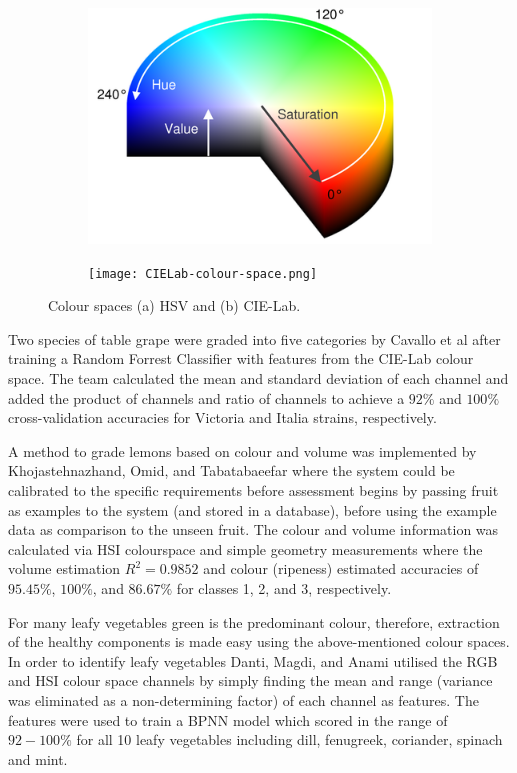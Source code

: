 \documentclass[fleqn,twoside,12pt]{report}
\begin{document}
\begin{figure}[h]
	\centering
	\begin{subfigure}{.5\textwidth}
		\centering
		\includegraphics[width=.7\linewidth]{hue_sat.png}
		\caption{}
		\label{fig:HSV}
	\end{subfigure}%
	\begin{subfigure}{.5\textwidth}
		\centering
		\texttt{[image: CIELab-colour-space.png]}
		\caption{}
		\label{fig:Lab}
	\end{subfigure}%
	\caption{Colour spaces (a) HSV and (b) CIE-Lab.}
	\label{fig:colour-space}
\end{figure}

Two species of table grape were graded into five categories by Cavallo et al \cite{cavallo} after training a Random Forrest Classifier with features from the CIE-Lab colour space. The team calculated the mean and standard deviation of each channel and added the product of channels and ratio of channels to achieve a $92\%$ and $100\%$ cross-validation accuracies for Victoria and Italia strains, respectively.

A method to grade lemons based on colour and volume was implemented by Khojastehnazhand, Omid, and Tabatabaeefar \cite{khojastehnazhand} where the system could be calibrated to the specific requirements before assessment begins by passing fruit as examples to the system (and stored in a database), before using the example data as comparison to the unseen fruit. The colour and volume information was calculated via HSI colourspace and simple geometry measurements where the volume estimation $R^2 = 0.9852$ and colour (ripeness) estimated accuracies of $95.45\%$, $100\%$, and $86.67\%$ for classes 1, 2, and 3, respectively.

For many leafy vegetables green is the predominant colour, therefore, extraction of the healthy components is made easy using the above-mentioned colour spaces. In order to identify leafy vegetables Danti, Magdi, and Anami \cite{danti} utilised the RGB and HSI colour space channels by simply finding the mean and range (variance was eliminated as a non-determining factor) of each channel as features. The features were used to train a BPNN model which scored in the range of $92-100\%$ for all 10 leafy vegetables including dill, fenugreek, coriander, spinach and mint. 
\end{document}
